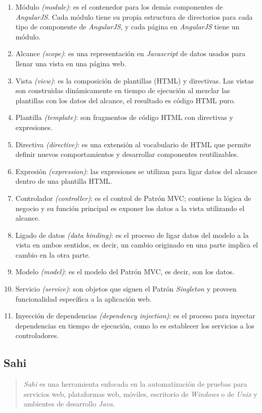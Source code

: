 \begin{enumerate}
	\item Módulo \textit{(module)}: es el contenedor para los demás componentes de \textit{AngularJS}. Cada módulo tiene su propia estructura de directorios para cada tipo de componente de \textit{AngularJS}, y cada página en \textit{AngularJS} tiene un módulo.
	\item Alcance \textit{(scope)}: es una representación en \textit{Javascript} de datos usados para llenar una vista en una página web.
	\item Vista \textit{(view)}: es la composición de plantillas (HTML) y directivas. Las vistas son construidas dinámicamente en tiempo de ejecución al mezclar las plantillas con los datos del alcance, el resultado es código HTML puro.
	\item Plantilla \textit{(template)}: son fragmentos de código HTML con directivas y expresiones.
	\item Directiva \textit{(directive)}: es una extensión al vocabulario de HTML que permite definir nuevos comportamientos y desarrollar componentes reutilizables.
	\item Expresión \textit{(expression)}: las expresiones se utilizan para ligar datos del alcance dentro de una plantilla HTML.
	\item Controlador \textit{(controller)}: es el control de Patrón MVC; contiene la lógica de negocio y su función principal es exponer los datos a la vista utilizando el alcance.
	\item Ligado de datos \textit{(data binding)}: es el proceso de ligar datos del modelo a la vista en ambos sentidos, es decir, un cambio originado en una parte implica el cambio en la otra parte.
	\item Modelo \textit{(model)}: es el modelo del Patrón MVC, es decir, son los datos.
	\item Servicio \textit{(service)}: son objetos que siguen el Patrón \textit{Singleton} y proveen funcionalidad específica a la aplicación web.
	\item Inyección de dependencias \textit{(dependency injection)}: es el proceso para inyectar dependencias en tiempo de ejecución, como lo es establecer los servicios a los controladores.
\end{enumerate}

\subsection{Sahi}\label{sec:sahi}
\begin{quote}
	\textit{Sahi} es una herramienta enfocada en la automatización de pruebas para servicios web, plataformas web, móviles, escritorio de \textit{Windows}\textsuperscript{\textcopyright} o de \textit{Unix} y ambientes de desarrollo \textit{Java}\cite{SahiPro}.
\end{quote}

